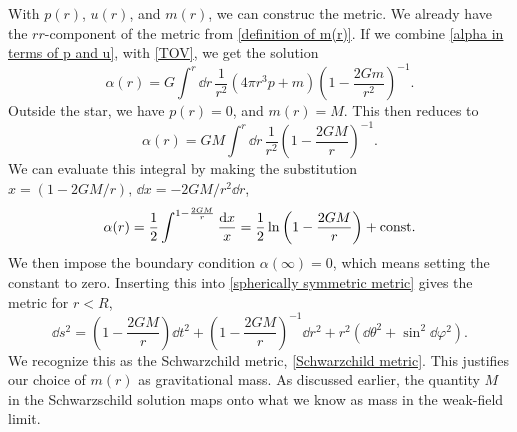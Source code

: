 With $p(r)$, $u(r)$, and $m(r)$, we can construc the metric.
We already have the $rr$-component of the metric from \autoref{definition of m(r)}.
If we combine \autoref{alpha in terms of p and u}, with \autoref{TOV}, we get the solution
%
\begin{equation}
    \label{solution to alpha}
    \alpha(r) = G \int^r \dd r \, \frac{1}{r^2} (4 \pi r^3 p + m)
    \left(1 - \frac{2 G m}{r^2} \right)^{-1}.
\end{equation}
%
Outside the star, we have $p(r) = 0$, and $m(r) = M$.
This then reduces to
%
\begin{equation}
    \alpha(r) = G M \int^r \dd r \, \frac{1}{r^2} \left(1 - \frac{2 G M}{r}\right)^{-1}.
\end{equation}
%
We can evaluate this integral by making the substitution $x = (1 - 2GM/r), \, \dd x = - 2GM/r^2 \dd r$,
%
\begin{equation}
    \alpha(r) = \frac{1}{2} \int^{1-\frac{2GM}{r}} \frac{\dd x}{x}
    = \frac{1}{2} \ln \left(1 - \frac{2GM}{r}\right) + \mathrm{const.}
\end{equation}
%
We then impose the boundary condition $\alpha(\infty) = 0$, which means setting the constant to zero.
Inserting this into \autoref{spherically symmetric metric} gives the metric for $r<R$,
%
\begin{equation}
    \dd s^2
    =
    \left(1 - \frac{2GM}{r}\right) \dd t^2
    + \left(1 - \frac{2 G M}{r}\right)^{-1} \dd r^2
    + r^2 \left(\dd \theta^2 + \sin^2\dd\varphi^2\right).
\end{equation}
%
We recognize this as the Schwarzchild metric, \autoref{Schwarzchild metric}.
This justifies our choice of $m(r)$ as gravitational mass.
As discussed earlier, the quantity $M$ in the Schwarzschild solution maps onto what we know as mass in the weak-field limit.



